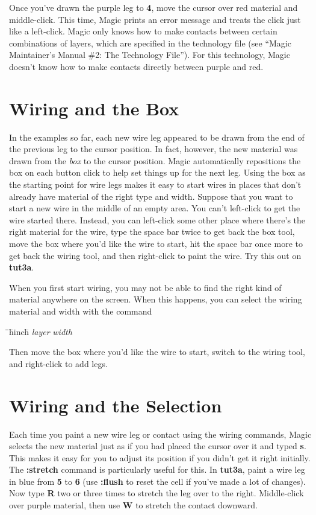 \documentclass[letterpaper,twoside,12pt]{article}
\def\hinch{\hspace*{0.5in}}
\def\starti{\begin{center}\begin{tabbing}\hinch\=\hinch\=\hinch\=hinch\hinch\=\kill}
\def\endi{\end{tabbing}\end{center}}
\def\ii{\>\>\>}
\begin{document}
Once you've drawn the purple leg to {\bfseries 4}, move the cursor over
red material and middle-click.  This time, Magic prints an error
message and treats the click just like a left-click.
Magic only knows how to make contacts between certain combinations of
layers, which are specified in the technology file
(see ``Magic Maintainer's Manual \#2: The Technology File'').  For
this technology, Magic doesn't know how to make contacts directly
between purple and red.

\section{Wiring and the Box}

In the examples so far, each new wire leg appeared to be
drawn from the end of the
previous leg to the cursor position.  In fact, however, the new
material was drawn from the {\itshape box} to the cursor position.  Magic
automatically repositions the box on each button click to help set
things up for the next leg.  Using the box as the starting point
for wire legs makes it easy to start wires in places that don't
already have material of the right type and width.  Suppose that you want
to start a new wire in the middle of an empty area.  You can't
left-click to get the wire started there.  Instead, you can left-click
some other place where there's the right material for the wire,
type the space bar twice to get back the box tool, move the box where
you'd like the wire to start, hit the space bar once more to get back
the wiring tool, and then right-click to paint the wire.  Try this
out on {\bfseries tut3a}.

When you first start wiring, you may not be able to find the right
kind of material anywhere on the screen.  When this happens, you
can select the wiring material and width with the command

\starti
   \ii {\bfseries :wire type} {\itshape layer} {\itshape width}
\endi

Then move the box where you'd like the wire to start, switch
to the wiring tool, and right-click to add legs.

\section{Wiring and the Selection}

Each time you paint a new wire leg or contact using the wiring
commands, Magic selects the new material just as if you had placed
the cursor over it and typed {\bfseries s}.  This makes it
easy for you to adjust its position if you didn't get it right
initially.  The {\bfseries :stretch} command is particularly useful
for this.  In {\bfseries tut3a}, paint a wire leg in blue from {\bfseries 5}
to {\bfseries 6} (use {\bfseries :flush} to reset the cell if you've made
a lot of changes).  Now type {\bfseries R} two or three times to stretch
the leg over to the right.  Middle-click over purple material,
then use {\bfseries W} to stretch the contact downward.
\end{document}
